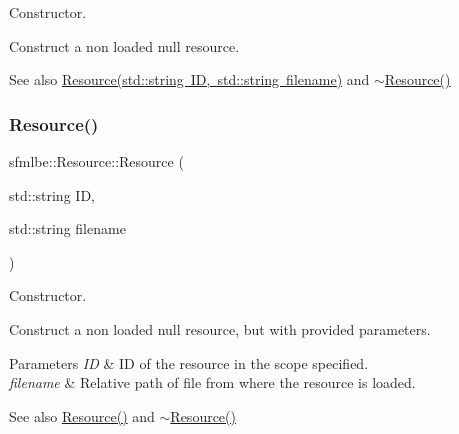 Constructor. 

Construct a non loaded null resource. \begin{DoxySeeAlso}{See also}
\mbox{\hyperlink{classsfmlbe_1_1_resource_a93030eb6f15353680a352fe10b204842}{Resource(std\+::string I\+D, std\+::string filename)}} and \mbox{\hyperlink{classsfmlbe_1_1_resource_a54ad6b8a18e74283c707ec1622c94f9f}{$\sim$\+Resource()}} 
\end{DoxySeeAlso}
\mbox{\label{classsfmlbe_1_1_resource_a93030eb6f15353680a352fe10b204842}} 
\subsubsection{\texorpdfstring{Resource()}{Resource()}\hspace{0.1cm}{\footnotesize\ttfamily [2/2]}}
{\footnotesize\ttfamily sfmlbe\+::\+Resource\+::\+Resource (\begin{DoxyParamCaption}\item[{std\+::string}]{ID,  }\item[{std\+::string}]{filename }\end{DoxyParamCaption})\hspace{0.3cm}{\ttfamily [inline]}}



Constructor. 

Construct a non loaded null resource, but with provided parameters. 
\begin{DoxyParams}{Parameters}
{\em ID} & ID of the resource in the scope specified. \\
\hline
{\em filename} & Relative path of file from where the resource is loaded. \\
\hline
\end{DoxyParams}
\begin{DoxySeeAlso}{See also}
\mbox{\hyperlink{classsfmlbe_1_1_resource_afc4c45a3b69da3904ab98d8096a5dbf6}{Resource()}} and \mbox{\hyperlink{classsfmlbe_1_1_resource_a54ad6b8a18e74283c707ec1622c94f9f}{$\sim$\+Resource()}} 
\end{DoxySeeAlso}
\mbox{\label{classsfmlbe_1_1_resource_a54ad6b8a18e74283c707ec1622c94f9f}} 
